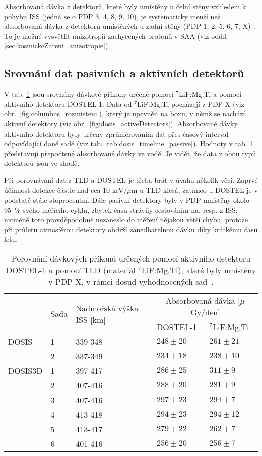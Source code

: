 Absorbovaná dávka z detektorů, které byly umístěny u čelní stěny vzhledem k pohybu ISS (jedná se o PDP 3, 4, 8, 9, 10), je systematicky menší než absorbovaná dávka z detektorů umístěných u zadní stěny (PDP 1, 2, 5, 6, 7, X)~\cite{dosis}. To je možné vysvětlit anizotropií zachycených protonů v SAA (viz oddíl \ref{sec:kosmickeZareni_anizotropie}).
\subsection{Srovnání dat pasivních a aktivních detektorů}%
V tab. \ref{tab:dosis_vysl_srovnaniPassiveActive} jsou srovnány dávkové příkony určené pomocí $^7$LiF:Mg,Ti a pomocí aktivního detektoru DOSTEL-1. Data od $^7$LiF:Mg,Ti pocházejí z PDP X (viz obr.~\ref{fig:columbus_rozmisteni}), který je upevněn na boxu, v němž se nachází aktivní detektory (viz obr.~\ref{fig:dosis_activeDetectors}). Absorbované dávky aktivního detektoru byly určeny zprůměrováním dat přes časový interval odpovídající dané sadě (viz tab. \ref{tab:dosis_timeline_passive}). Hodnoty v tab. \ref{tab:dosis_vysl_srovnaniPassiveActive} představují přepočtené absorbované dávky ve vodě. Je vidět, že data z obou typů detektorů jsou ve shodě. 

Při porovnávání dat z TLD a DOSTEL je třeba brát v úvahu několik věcí. Zaprvé účinnost detekce částic nad cca 10 keV/$\mu$m u TLD klesá, zatímco u DOSTEL je v podstatě stále stoprocentní. Dále pasivní detektory byly v PDP umístěny okolo 95~\% svého měřícího cyklu, zbytek času strávily cestováním na, resp. z ISS; nicméně toto pravděpodobně nezaneslo do měření nějakou větší chybu, protože při průletu atmosférou detektory obdrží zanedbatelnou dávku díky krátkému času letu.
\begin{table}[H]
  \centering
  \footnotesize
  \caption{Porovnání dávkových příkonů určených pomocí aktivního detektoru DOSTEL-1 a pomocí TLD (materiál $^7$LiF:Mg,Ti), které byly umístěny v PDP X, v rámci dosud vyhodnocených sad~\cite{dosis}.}
  \label{tab:dosis_vysl_srovnaniPassiveActive}
  \begin{tabular}{lll|ll}
	\toprule
	&\multirow{2}{*}{Sada}&\multirow{2}{*}{Nadmořská výška ISS [km]}&\multicolumn{2}{c}{Absorbovaná dávka [$\mu$Gy/den]}\\
	 & & &DOSTEL-1&$^7$LiF:Mg,Ti\\
	\midrule
	DOSIS	&1&339-348&$248\pm20$&$261\pm21$\\ 
			&2&337-349&$234\pm18$&$238\pm10$\\
	DOSIS3D	&1&397-417&$286\pm25$&$311\pm9 $\\
			&2&407-416&$288\pm20$&$281\pm9 $\\
			&3&407-416&$297\pm23$&$294\pm7 $\\
			&4&413-418&$294\pm23$&$294\pm12$\\
			&5&413-417&$279\pm22$&$262\pm7 $\\
			&6&401-416&$256\pm20$&$256\pm7 $\\
	\bottomrule
  \end{tabular}
\end{table}

